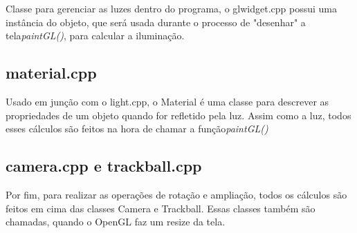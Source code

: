 Classe para gerenciar as luzes dentro do programa, o glwidget.cpp possui uma 
instância do objeto, que será usada durante o processo de "desenhar" a tela\emph{paintGL()}, para 
calcular a iluminação.

\subsection{material.cpp}

Usado em junção com o light.cpp, o Material é uma classe para descrever 
as propriedades de um objeto quando for refletido pela luz. Assim como a luz, 
todos esses cálculos são feitos na hora de chamar a função\emph{paintGL()}

\subsection{camera.cpp e trackball.cpp}

Por fim, para realizar as operações de rotação e ampliação, todos 
os cálculos são feitos em cima das classes Camera e Trackball. Essas classes 
também são chamadas, quando o OpenGL faz um resize da tela.


